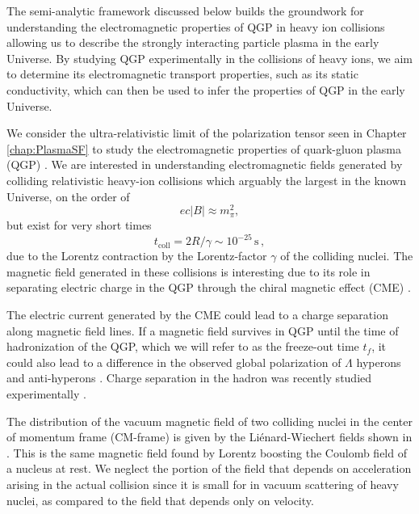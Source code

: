 {\color{black} The semi-analytic framework discussed below builds the groundwork for understanding the electromagnetic properties of QGP in heavy ion collisions allowing us to describe the strongly interacting particle plasma in the early Universe. By studying QGP experimentally in the collisions of heavy ions, we aim to determine its electromagnetic transport properties, such as its static conductivity, which can then be used to infer the properties of QGP in the early Universe.}

We consider the ultra-relativistic limit of the polarization tensor seen in Chapter \ref{chap:PlasmaSF} to study the electromagnetic properties of quark-gluon plasma (QGP) \cite{Grayson:2022asf}. We are interested in understanding  electromagnetic fields generated by colliding relativistic heavy-ion collisions which arguably  the largest in the known Universe, on the order of 
\begin{equation}\label{eq:Bcol}
ec|B| \approx m_\pi^2,
\end{equation}
but exist for very short times 
\begin{equation}\label{eq:tcol}
t_{\text{coll}}= 2 R/\gamma \sim 10^{-25}\,\textrm{s}\,,
\end{equation}
due to the Lorentz contraction by the Lorentz-factor $\gamma$ of the colliding nuclei. The magnetic field generated in these collisions is interesting due to its role in separating electric charge in the QGP through the chiral magnetic effect (CME) \cite{Kharzeev:2007jp}.

The electric current generated by the CME could lead to a charge separation along magnetic field lines. If a magnetic field survives in QGP until the time of hadronization of the QGP, which we will refer to as the freeze-out time $t_f$, it could also lead to a difference in the observed global polarization of $\Lambda$ hyperons and anti-hyperons \cite{Muller:2018ibh}. Charge separation in the hadron was recently studied experimentally \cite{STAR:2023jdd}. 

The distribution of the vacuum magnetic field of two colliding nuclei in the center of momentum frame (CM-frame) is given by the Li\'enard-Wiechert fields shown in . This is the same magnetic field found by Lorentz boosting the Coulomb field of a nucleus at rest. We neglect the portion of the field that depends on acceleration arising in the actual collision since it is small for in vacuum scattering of heavy nuclei, as compared to the field that depends only on velocity.

